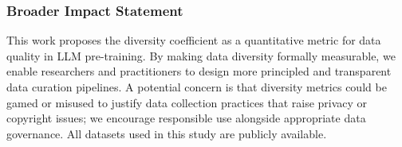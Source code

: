 \documentclass[10pt]{article}
\begin{document}
\subsubsection*{Broader Impact Statement}
This work proposes the diversity coefficient as a quantitative metric for data quality in LLM pre-training.
By making data diversity formally measurable, we enable researchers and practitioners to design more principled and transparent data curation pipelines.
A potential concern is that diversity metrics could be gamed or misused to justify data collection practices that raise privacy or copyright issues; we encourage responsible use alongside appropriate data governance.
All datasets used in this study are publicly available.






\appendix

\end{document}
